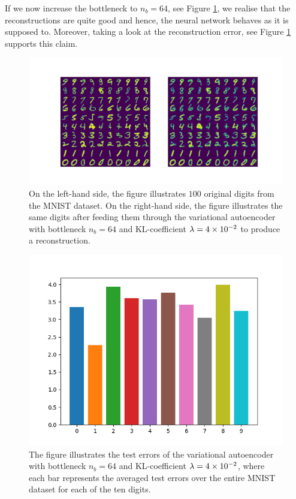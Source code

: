 If we now increase the bottleneck to $n_b=64$, see Figure \ref{fig:convolutional_VAE_snd_KL_4e-2_10k_epochs_64D_inference}, we realise that the reconstructions are quite good and hence, the neural network behaves as it is supposed to. Moreover, taking a look at the reconstruction error, see Figure \ref{fig:convolutional_VAE_snd_KL_4e-2_10k_epochs_64D_inference} supports this claim.

\begin{figure}
\begin{center}
      \includegraphics[trim = 15mm 10mm 15mm 15mm, clip, width=\linewidth]{convolutional_VAE_snd_KL_4e-2_10k_epochs_64D_inference}
\end{center}
\caption{On the left-hand side, the figure illustrates $100$ original digits from the MNIST dataset. On the right-hand side, the figure illustrates the same digits after feeding them through the variational autoencoder with bottleneck $n_b=64$ and KL-coefficient $\lambda=\num{4e-2}$ to produce a reconstruction.}\label{fig:convolutional_VAE_snd_KL_4e-2_10k_epochs_64D_inference}
\end{figure}

\begin{figure}
\begin{center}
      \includegraphics[width=0.49\linewidth]{convolutional_VAE_snd_KL_4e-2_10k_epochs_64D_errors}
\end{center}
\caption{The figure illustrates the test errors of the variational autoencoder with bottleneck $n_b=64$ and KL-coefficient $\lambda = \num{4e-2}$, where each bar represents the averaged test errors over the entire MNIST dataset for each of the ten digits.}\label{fig:convolutional_VAE_snd_KL_4e-2_10k_epochs_64D_errors}
\end{figure}



